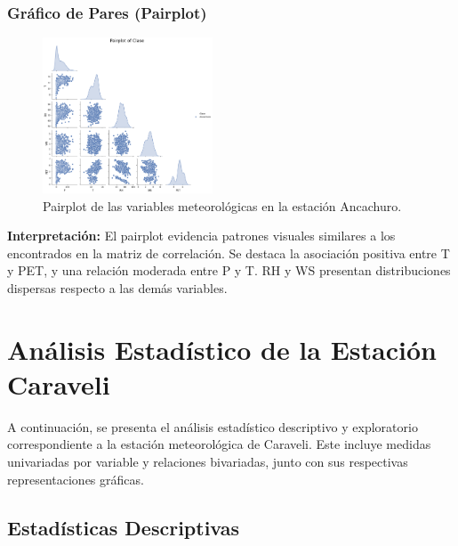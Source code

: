 \subsubsection*{Gráfico de Pares (Pairplot)}
\begin{figure}[H]
\centering
\includegraphics[width=0.45\textwidth]{resultados/por_estacion_meteorologica/Ancachuro/pairplot.png}
\caption{Pairplot de las variables meteorológicas en la estación Ancachuro.}
\label{fig:ancachuro_pairplot}
\end{figure}
\textbf{Interpretación:} El pairplot evidencia patrones visuales similares a los encontrados en la matriz de correlación. Se destaca la asociación positiva entre T y PET, y una relación moderada entre P y T. RH y WS presentan distribuciones dispersas respecto a las demás variables.





\section{Análisis Estadístico de la Estación Caraveli}

A continuación, se presenta el análisis estadístico descriptivo y exploratorio correspondiente a la estación meteorológica de Caraveli. Este incluye medidas univariadas por variable y relaciones bivariadas, junto con sus respectivas representaciones gráficas.

\subsection{Estadísticas Descriptivas}

